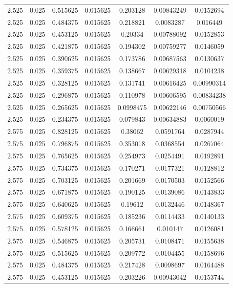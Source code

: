 \begin{flushleft}
\begin{longtable}{ccccccc}
2.525 & 0.025 & 0.515625 & 0.015625 & 0.203128 & 0.00843249 & 0.0152694  \\ 
2.525 & 0.025 & 0.484375 & 0.015625 & 0.218821 & 0.0083287 & 0.016449  \\ 
2.525 & 0.025 & 0.453125 & 0.015625 & 0.20334 & 0.00788092 & 0.0152853  \\ 
2.525 & 0.025 & 0.421875 & 0.015625 & 0.194302 & 0.00759277 & 0.0146059  \\ 
2.525 & 0.025 & 0.390625 & 0.015625 & 0.173786 & 0.00687563 & 0.0130637  \\ 
2.525 & 0.025 & 0.359375 & 0.015625 & 0.138667 & 0.00629318 & 0.0104238  \\ 
2.525 & 0.025 & 0.328125 & 0.015625 & 0.131741 & 0.00616425 & 0.00990314  \\ 
2.525 & 0.025 & 0.296875 & 0.015625 & 0.110978 & 0.00606595 & 0.00834238  \\ 
2.525 & 0.025 & 0.265625 & 0.015625 & 0.0998475 & 0.00622146 & 0.00750566  \\ 
2.525 & 0.025 & 0.234375 & 0.015625 & 0.079843 & 0.00634883 & 0.0060019  \\ 
2.575 & 0.025 & 0.828125 & 0.015625 & 0.38062 & 0.0591764 & 0.0287944  \\ 
2.575 & 0.025 & 0.796875 & 0.015625 & 0.353018 & 0.0368554 & 0.0267064  \\ 
2.575 & 0.025 & 0.765625 & 0.015625 & 0.254973 & 0.0254491 & 0.0192891  \\ 
2.575 & 0.025 & 0.734375 & 0.015625 & 0.170271 & 0.0177321 & 0.0128812  \\ 
2.575 & 0.025 & 0.703125 & 0.015625 & 0.201669 & 0.0170503 & 0.0152566  \\ 
2.575 & 0.025 & 0.671875 & 0.015625 & 0.190125 & 0.0139086 & 0.0143833  \\ 
2.575 & 0.025 & 0.640625 & 0.015625 & 0.19612 & 0.0132446 & 0.0148367  \\ 
2.575 & 0.025 & 0.609375 & 0.015625 & 0.185236 & 0.0114433 & 0.0140133  \\ 
2.575 & 0.025 & 0.578125 & 0.015625 & 0.166661 & 0.010147 & 0.0126081  \\ 
2.575 & 0.025 & 0.546875 & 0.015625 & 0.205731 & 0.0108471 & 0.0155638  \\ 
2.575 & 0.025 & 0.515625 & 0.015625 & 0.209772 & 0.0104455 & 0.0158696  \\ 
2.575 & 0.025 & 0.484375 & 0.015625 & 0.217428 & 0.0098697 & 0.0164488  \\ 
2.575 & 0.025 & 0.453125 & 0.015625 & 0.203226 & 0.00943042 & 0.0153744  \\ 

\end{longtable}
\end{flushleft}
